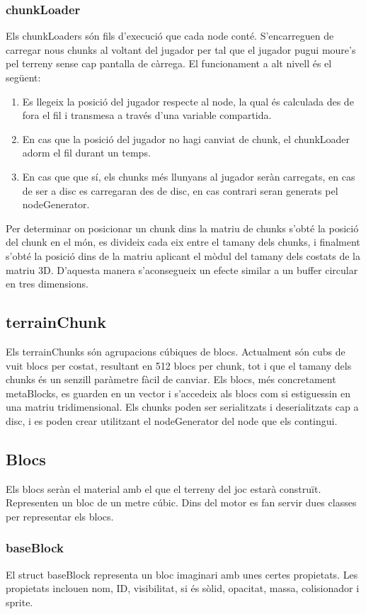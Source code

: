 \subsubsection{chunkLoader}
Els chunkLoaders són fils d'execució que cada node conté. S'encarreguen de carregar nous chunks al voltant del jugador per tal que el jugador pugui moure's pel terreny sense cap pantalla de càrrega.
El funcionament a alt nivell és el següent:
\begin{enumerate}
  \item Es llegeix la posició del jugador respecte al node, la qual és calculada des de fora el fil i transmesa a través d'una variable compartida.
  \item En cas que la posició del jugador no hagi canviat de chunk, el chunkLoader adorm el fil durant un temps.
  \item En cas que que sí, els chunks més llunyans al jugador seràn carregats, en cas de ser a disc es carregaran des de disc, en cas contrari seran generats pel nodeGenerator.
\end{enumerate}
Per determinar on posicionar un chunk dins la matriu de chunks s'obté la posició del chunk en el món, es divideix cada eix entre el tamany dels chunks, i finalment s'obté la posició dins de la matriu aplicant el mòdul del tamany dels costats de la matriu 3D.
D'aquesta manera s'aconsegueix un efecte similar a un buffer circular en tres dimensions.

\subsection{terrainChunk}
Els terrainChunks són agrupacions cúbiques de blocs. Actualment són cubs de vuit blocs per costat, resultant en 512 blocs per chunk, tot i que el tamany dels chunks és un senzill paràmetre fàcil de canviar.
Els blocs, més concretament metaBlocks, es guarden en un vector i s'accedeix als blocs com si estiguessin en una matriu tridimensional.
Els chunks poden ser serialitzats i deserialitzats cap a disc, i es poden crear utilitzant el nodeGenerator del node que els contingui.
\subsection{Blocs}
Els blocs seràn el material amb el que el terreny del joc estarà construït. Representen un bloc de un metre cúbic. Dins del motor es fan servir dues classes per representar els blocs.
\subsubsection{baseBlock}
El struct baseBlock representa un bloc imaginari amb unes certes propietats. Les propietats inclouen nom, ID, visibilitat, si és sòlid, opacitat, massa, colisionador i sprite.

